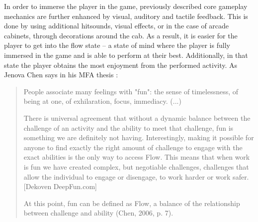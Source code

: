 In order to immerse the player in the game, previously described core gameplay mechanics are further enhanced by visual, auditory and tactile feedback. This is done by using additional hitsounds, visual effects, or in the case of arcade cabinets, through decorations around the cab. As a result, it is easier for the player to get into the flow state -- a state of mind where the player is fully immersed in the game and is able to perform at their best. Additionally, in that state the player obtains the most enjoyment from the performed activity. As Jenova Chen says in his MFA thesis \cite{chen2006flow}:
\begin{quote}
    People associate many feelings with "fun": the sense of timelessness, of being at one, of exhilaration, focus, immediacy. (...)
    
    There is universal agreement that without a dynamic balance between the challenge of an activity and the ability to meet that challenge, fun is something we are definitely not having. Interestingly, making it possible for anyone to find exactly the right amount of challenge to engage with the exact abilities is the only way to access Flow. This means that when work is fun we have created complex, but negotiable challenges, challenges that allow the individual to engage or disengage, to work harder or work safer. [Dekoven DeepFun.com]
    
    At this point, fun can be defined as Flow, a balance of the relationship between challenge and ability (Chen, 2006, p. 7).
\end{quote} 
